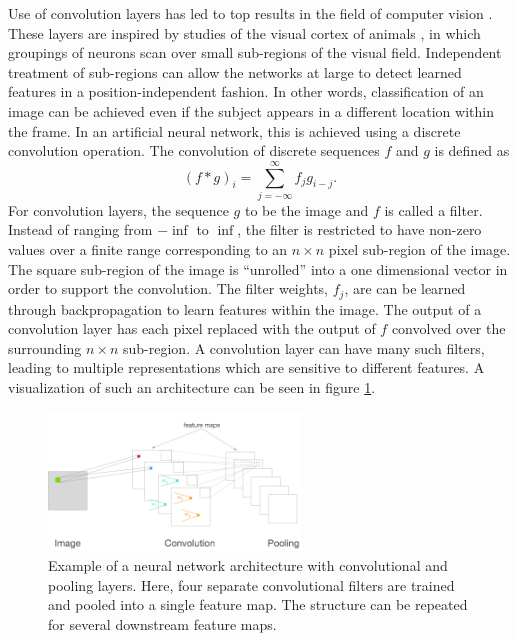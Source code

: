 Use of convolution layers has led to top results in the field of computer vision \cite{lecun2010convolutional,krizhevsky2012imagenet}.  These layers are inspired by studies of the visual cortex of animals  \cite{lecun2015deep}, in which groupings of neurons scan over small sub-regions of the visual field.  Independent treatment of sub-regions can allow the networks at large to detect learned features in a position-independent fashion.  In other words, classification of an image can be achieved even if the subject appears in a different location within the frame.  In an artificial neural network, this is achieved using a  discrete convolution operation.  The convolution of discrete sequences $f$ and $g$ is defined as
\begin{equation}
(f*g)_i = \sum_{j = -\infty}^{\infty} f_j g_{i-j}.
\end{equation}
For convolution layers, the sequence $g$ to be the image and $f$ is called a filter.  Instead of ranging from $-\inf$ to $\inf$, the filter is restricted to have non-zero values over a finite range corresponding to an $n \times n$ pixel sub-region of the image.  The square sub-region of the image is ``unrolled'' into a one dimensional vector in order to support the convolution.  The filter weights, $f_j$, are can be learned through backpropagation to learn features within the image.  The output of a convolution layer has each pixel replaced with the output of $f$ convolved over the surrounding $n\times n$ sub-region.  A convolution layer can have many such filters, leading to multiple representations which are sensitive to different features.  A visualization of such an architecture can be seen in figure \ref{convnet}.

\begin{figure}[t]
  \begin{center}
    \includegraphics[width=0.6\textwidth]{figures/figures/convnet.png}
  \end{center}
  \caption[Example of a convolutional network architecture]{Example of a neural network architecture with convolutional and pooling layers.  Here, four separate convolutional filters are trained and pooled into a single feature map.  The structure can be repeated for several downstream feature maps.}
  \label{convnet}
\end{figure}

